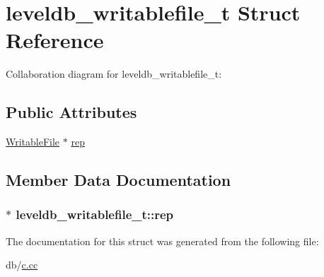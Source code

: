 \hypertarget{structleveldb__writablefile__t}{\section{leveldb\-\_\-writablefile\-\_\-t Struct Reference}
\label{structleveldb__writablefile__t}
}


Collaboration diagram for leveldb\-\_\-writablefile\-\_\-t\-:
\subsection*{Public Attributes}
\begin{DoxyCompactItemize}
\item 
\hyperlink{classleveldb_1_1_writable_file}{Writable\-File} $\ast$ \hyperlink{structleveldb__writablefile__t_a3cf7e2a9ac0560d667deee9d574d7761}{rep}
\end{DoxyCompactItemize}


\subsection{Member Data Documentation}
\hypertarget{structleveldb__writablefile__t_a3cf7e2a9ac0560d667deee9d574d7761}{
\subsubsection[{rep}]{$\ast$ leveldb\-\_\-writablefile\-\_\-t\-::rep}}\label{structleveldb__writablefile__t_a3cf7e2a9ac0560d667deee9d574d7761}


The documentation for this struct was generated from the following file\-:\begin{DoxyCompactItemize}
\item 
db/\hyperlink{c_8cc}{c.\-cc}\end{DoxyCompactItemize}
